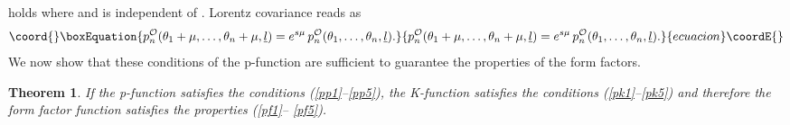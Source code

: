\documentclass[a4paper,a4paper]{article}
\newtheorem{theorem}{Theorem}
\begin{document}
holds where \coordHE{} and \coordHE{}
is independent of \coordHE{}. Lorentz covariance reads
as 
\begin{equation}\coord{}\boxEquation{
p_{n}^{\mathcal{O}}(\theta _{1}+\mu ,\dots ,\theta _{n}+\mu ,\underline{l}
)=e^{s\mu }\,p_{n}^{\mathcal{O}}(\theta _{1},\dots ,\theta _{n},\underline{l}
).  \label{pp5}
}{
p_{n}^{\mathcal{O}}(\theta _{1}+\mu ,\dots ,\theta _{n}+\mu ,\underline{l}
)=e^{s\mu }\,p_{n}^{\mathcal{O}}(\theta _{1},\dots ,\theta _{n},\underline{l}
).  }{ecuacion}\coordE{}\end{equation}
We now show that these conditions of the p-function are sufficient to
guarantee the properties of the form factors.

\begin{theorem}
\label{t1}If the p-function \coordHE{} satisfies the conditions (\ref{pp1}--\ref{pp5}), the
K-function \coordHE{} satisfies the
conditions (\ref{pk1}--\ref{pk5}) and therefore the form factor function \coordHE{} satisfies the properties (\ref{pf1}--%
\ref{pf5}).
\end{theorem}
\end{document}
